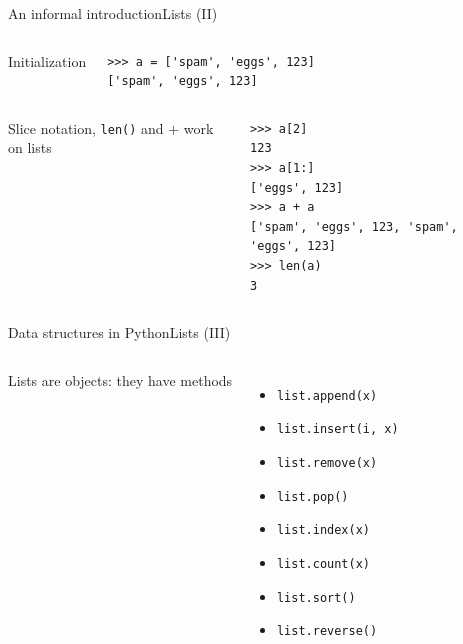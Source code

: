\documentclass[10pt,compress]{beamer} %
\begin{document}
\begin{frame}[fragile]{An informal introduction}{Lists (II)}
    \vspace{-0.7cm}
	\begin{columns}
		Initialization

		\begin{exampleblock}{}
		\begin{verbatim}
>>> a = ['spam', 'eggs', 123]
['spam', 'eggs', 123]
\end{verbatim}
		\end{exampleblock}
	\end{columns}

	\begin{columns}
 	   	\column{.30\textwidth}
		Slice notation, \texttt{len()} and $+$ work on lists

   		\column{.70\textwidth}
		\begin{exampleblock}{}
		\begin{verbatim}
>>> a[2]
123
>>> a[1:]
['eggs', 123]
>>> a + a
['spam', 'eggs', 123, 'spam', 'eggs', 123]
>>> len(a)
3
\end{verbatim}
		\end{exampleblock}
	\end{columns}
\end{frame}

\begin{frame}{Data structures in Python}{Lists (III)}
    \begin{columns}
 	   \column{.40\textwidth}
	   Lists are objects: they have methods
	\begin{itemize}
		\item \texttt{list.append(x)}
		\item \texttt{list.insert(i, x)}
		\item \texttt{list.remove(x)}
		\item \texttt{list.pop()}
		\item \texttt{list.index(x)}
		\item \texttt{list.count(x)}
		\item \texttt{list.sort()}
		\item \texttt{list.reverse()}
	\end{itemize}

 	   \column{.60\textwidth}
        \scriptsize{
		\begin{exampleblock}{}
		\vspace{-0.4cm}
		
		\vspace{-0.2cm}
		\end{exampleblock}
		}
   \end{columns}
\end{frame}
\end{document}
